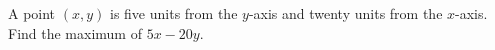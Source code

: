 A point $(x,y)$ is five units from the $y$-axis and twenty units from the $x$-axis. Find the maximum of $5x-20y$.
